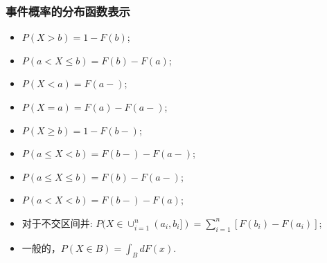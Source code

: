 \begin{frame}
	\frametitle{事件概率的分布函数表示}
	\begin{itemize}[<+-|alert@+>]
		\item $P(X> b)=1-F(b)$;%
		\item $P(a< X\le b)=F(b)-F(a)$;%

		\item $P(X<a)=F(a-)$;%

		\item $P(X=a)=F(a)-F(a-)$;%
		\item $P(X\ge b)=1-F(b-)$;%

		\item $P(a\le X<b)=F(b-)-F(a-)$;%
		\item $P(a\le X\le b)=F(b)-F(a-)$;%
		\item $P(a< X<b)=F(b-)-F(a)$;%
		\item 对于不交区间并: %
		$P (X\in \cup_{i=1}^n (a_i,b_i])=\sum_{i=1}^n [F (b_i)-F (a_i)]$;%
		\item 一般的，$P (X\in B)=\int_BdF (x)$.
	\end{itemize}
\end{frame}



